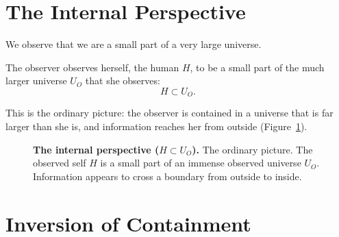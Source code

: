 \documentclass[11pt]{book}
\begin{document}
\section{The Internal Perspective}
\label{sec:internal}

We observe that we are a small part of a very large universe.

\begin{axiom}\label{ax:internal}
  The observer observes herself, the human $H$, to be a small part of the
  much larger universe $U_O$ that she observes:
  \[
    H \subset U_O.
  \]
\end{axiom}

This is the ordinary picture: the observer is contained in a universe that
is far larger than she is, and information reaches her from outside
(Figure~\ref{fig:contained}).

\begin{figure}[htbp]
\centering
{}
\caption{\textbf{The internal perspective ($H \subset U_O$).}
  The ordinary picture. The observed self $H$ is a small part of an
  immense observed universe $U_O$. Information appears to cross a boundary
  from outside to inside.}
\label{fig:contained}
\end{figure}


\section{Inversion of Containment}
\label{sec:inversion}
\end{document}
